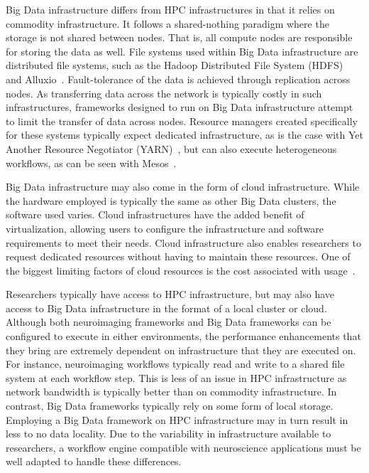             Big Data infrastructure differs from HPC infrastructures in that it
            relies on commodity infrastructure. It follows a shared-nothing paradigm
            where the storage is not shared between nodes. That is, all compute
            nodes are responsible for storing the data as well. File systems
            used within Big Data infrastructure are distributed file systems, such as
            the Hadoop Distributed File System (HDFS)~\cite{5496972} and
            Alluxio~\cite{Li:2014:TRM:2670979.2670985}. Fault-tolerance of the
            data is achieved through replication across nodes. As transferring
            data across the network is typically costly in such infrastructures,
            frameworks designed to run on Big Data infrastructure attempt to
            limit the transfer of data across nodes. Resource managers created
            specifically for these systems typically expect dedicated
            infrastructure, as is the case with Yet Another Resource Negotiator
            (YARN)~\cite{Vavilapalli:2013:AHY:2523616.2523633}, but can also
            execute heterogeneous workflows, as can be seen with
            Mesos~\cite{hindman2011mesos}.

            Big Data infrastructure may also come in the form of cloud
            infrastructure. While the hardware employed is typically the same as
            other Big Data clusters, the software used varies. Cloud
            infrastructures have the added benefit of virtualization, allowing
            users to configure the infrastructure and software requirements to
            meet their needs. Cloud infrastructure also enables researchers to
            request dedicated resources without having to maintain these
            resources. One of the biggest limiting factors of cloud resources is
            the cost associated with usage~\cite{10.3389/fninf.2017.00063}.

            Researchers typically have access to HPC infrastructure, but may
            also have access to Big Data infrastructure in the format of a local
            cluster or cloud. Although both neuroimaging frameworks and Big Data
            frameworks can be configured to execute in either environments, the
            performance enhancements that they bring are extremely dependent on
            infrastructure that they are executed on. For instance, neuroimaging
            workflows typically read and write to a shared file system at each
            workflow step. This is less of an issue in HPC infrastructure as
            network bandwidth is typically better than on commodity
            infrastructure. In contrast, Big Data frameworks typically rely on
            some form of local storage. Employing a Big Data
            framework on HPC infrastructure may in turn result in less to no
            data locality. Due to the variability in
            infrastructure available to researchers, a workflow engine
            compatible with neuroscience applications must be well adapted to handle these differences.

